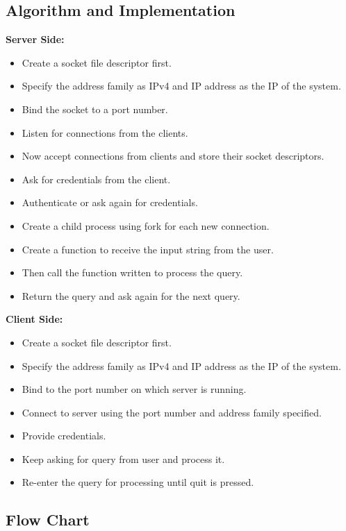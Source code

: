 \documentclass[12pt]{article}
\begin{document}
		\subsection{Algorithm and Implementation~\cite{1}~\cite{2}~\cite{3}}
			\textbf{Server Side:}
			\begin{itemize}
				\item Create a socket file descriptor first.
				\item Specify the address family as IPv4 and IP address as the IP of the system.
			    \item Bind the socket to a port number.
			    \item Listen for connections from the clients.
			    \item Now accept connections from clients and store their socket descriptors.
			    \item Ask for credentials from the client.
			    \item Authenticate or ask again for credentials.
			    \item Create a child process using fork for each new connection.
			    \item Create a function to receive the input string from the user.
			    \item Then call the function written to process the query.
			    \item Return the query and ask again for the next query.
			\end{itemize}
			\textbf{Client Side:}
			\begin{itemize}
				\item Create a socket file descriptor first.
				\item Specify the address family as IPv4 and IP address as the IP of the system.
				\item Bind to the port number on which server is running.
				\item Connect to server using the port number and address family specified.
				\item Provide credentials.
				\item Keep asking for query from user and process it.
				\item Re-enter the query for processing until quit is pressed.
			\end{itemize}			
		\subsection{Flow Chart}
		
\end{document}
